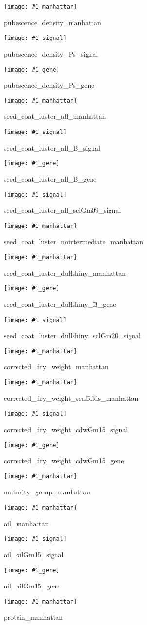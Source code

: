 \documentclass[12pt]{article}
\newenvironment{cfigure}
	{\begin{figure} \centering}
	{\end{figure}}
\newcommand{\manhattanplot}[1]{
\begin{cfigure}
	\texttt{[image: \#1\_manhattan]}
	\caption{#1\_manhattan}
	\label{#1_manhattan}
\end{cfigure}

\clearpage}
\newcommand{\signalplot}[1]{
\begin{cfigure}
	\texttt{[image: \#1\_signal]}
	\caption{#1\_signal}
	\label{#1_signal}
\end{cfigure}

\clearpage}
\newcommand{\geneplot}[1]{
\begin{cfigure}
	\texttt{[image: \#1\_gene]}
	\caption{#1\_gene}
	\label{#1_gene}
\end{cfigure}

\clearpage}
\begin{document}
\manhattanplot{pubescence_density}
\signalplot{pubescence_density_Ps}
\geneplot{pubescence_density_Ps}


\manhattanplot{seed_coat_luster_all}
\signalplot{seed_coat_luster_all_B}
\geneplot{seed_coat_luster_all_B}
\signalplot{seed_coat_luster_all_sclGm09}

\manhattanplot{seed_coat_luster_nointermediate}

\manhattanplot{seed_coat_luster_dullshiny}
\geneplot{seed_coat_luster_dullshiny_B}
\signalplot{seed_coat_luster_dullshiny_sclGm20}

\manhattanplot{corrected_dry_weight}
\manhattanplot{corrected_dry_weight_scaffolds}
\signalplot{corrected_dry_weight_cdwGm15}
\geneplot{corrected_dry_weight_cdwGm15}


\manhattanplot{maturity_group}

\manhattanplot{oil}
\signalplot{oil_oilGm15}
\geneplot{oil_oilGm15}

\manhattanplot{protein}
\end{document}
